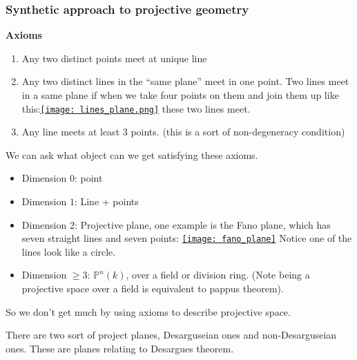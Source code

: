 \subsubsection{Synthetic approach to projective geometry}

\textbf{Axioms}\begin{enumerate}
    \item Any two distinct points meet at unique line
    \item Any two distinct lines in the ``same plane'' meet in one point. Two lines meet in a same plane if when we take four points on them and join them up like this:\newline \href{https://youtu.be/iNfFNwIK_co?t=937}{\texttt{[image: lines\_plane.png]}} these two lines meet. 
    \item Any line meets at least 3 points. (this is a sort of non-degeneracy condition)
\end{enumerate}

We can ask what object can we get satisfying these axioms.\begin{itemize}
    \item Dimension $0$: point
    \item Dimension $1$: Line + points
    \item Dimension $2$: Projective plane, one example is the Fano plane, which has seven straight lines and seven points: \href{https://en.wikipedia.org/wiki/Fano_plane}{\texttt{[image: fano\_plane]}} Notice one of the lines look like a circle.
    \item Dimension $\geq 3$: $\mathbb{P}^n(k)$, over a field or division ring. (Note being a projective space over a field is equivalent to pappus theorem). 
\end{itemize}

So we don't get much by using axioms to describe projective space.

\begin{remark}
    There are two sort of project planes, Desarguseian ones and non-Desarguseian ones. These are planes relating to Desargues theorem.  
\end{remark}

